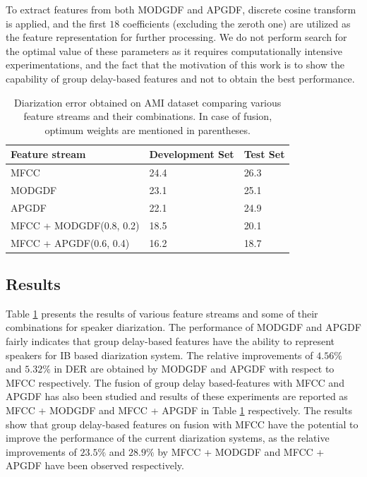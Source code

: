 \documentclass[conference]{IEEEtran}
\begin{document}
To extract features from both MODGDF and APGDF, discrete cosine transform is applied, and the first $18$ coefficients
(excluding the zeroth one) are utilized as the feature representation for further processing. 
We do not perform search for the optimal value of these parameters as it requires computationally intensive experimentations, and the fact that the motivation of this work is to show the capability of group delay-based features and not to obtain the best performance. 

\begin{table}[h]
\centering
\label{my-label}
\begin{tabular}{|l|l|l|}
\hline
Feature stream  & Development Set & Test Set \\ \hline
MFCC          & 24.4                   & 26.3            \\ \hline
MODGDF        & 23.1                   & 25.1            \\ \hline
APGDF         & 22.1                   & 24.9            \\ \hline
MFCC + MODGDF(0.8, 0.2) & 18.5          & 20.1            \\ \hline
MFCC + APGDF(0.6, 0.4)  & 16.2          & 18.7            \\ \hline
\end{tabular}
\vspace{0.4cm}
\label{table:results}
\caption{Diarization error obtained on AMI dataset comparing various feature
streams and their combinations. In case of fusion, optimum weights are mentioned
in parentheses.}
\end{table}


\subsection{Results}

Table \ref{table:results} presents the results of various feature streams and
some of their combinations for speaker diarization. The performance of MODGDF
and APGDF fairly indicates that group delay-based features have the ability to
represent speakers for IB based diarization system. The relative improvements of
$4.56\%$ and $5.32\%$ in DER are obtained by MODGDF and APGDF with respect to
MFCC respectively. The fusion of group delay based-features with MFCC and APGDF
has also been studied and results of these experiments are reported as MFCC +
MODGDF and MFCC + APGDF in Table \ref{table:results} respectively. The results
show that group delay-based features on fusion with MFCC have the potential to
improve the performance of the current diarization systems, as the relative
improvements of $23.5\%$ and $28.9\%$ by MFCC + MODGDF and MFCC + APGDF have
been observed respectively.
\end{document}
